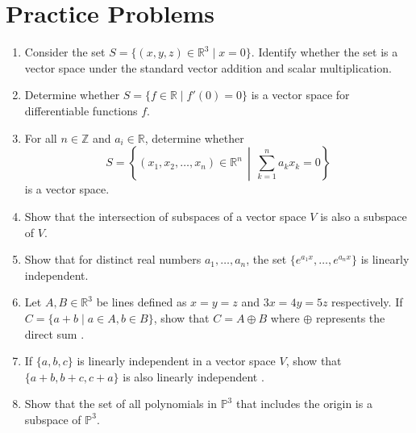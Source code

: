 \documentclass[../main.tex]{subfiles}
\begin{document}
\section{Practice Problems}
\begin{enumerate}
\item
Consider the set $S = \{ (x, y, z) \in \mathbb{R}^3 \mid x = 0 \}$.
Identify whether the set is a vector space under the standard vector
addition and scalar multiplication.

\item
Determine whether $S = \{ f \in \mathbb{R} \mid f'(0) = 0 \}$
is a vector space for differentiable functions $f$.

\item
For all $n \in \mathbb{Z}$ and $a_i \in \mathbb{R}$, determine whether
\[
S =
\left\{
    (x_1, x_2, \ldots, x_n) \in \mathbb{R}^n
    \,\middle\vert\,
    \sum_{k = 1}^n a_k x_k = 0
\right\}
\]
is a vector space.

\item
Show that the intersection of subspaces of a vector space $V$
is also a subspace of $V$.

\item
Show that for distinct real numbers $a_1, \ldots, a_n$, the set
$\{ e^{a_1 x}, \ldots, e^{a_n x} \}$ is linearly independent.

\item
Let $A, B \in \mathbb{R}^3$ be lines defined as $x = y = z$ and
$3x = 4y = 5z$ respectively. If $C = \{ a + b \mid a \in A, b \in B
\}$, show that $C = A \oplus B$ where $\oplus$ represents the direct
sum \cite{refbook1}.

\item
If $\{ a, b, c \}$ is linearly independent in a vector space $V$,
show that $\{ a+b, b+c, c+a \}$ is also linearly independent
\cite{refbook1}.

\item
Show that the set of all polynomials in $\mathbb{P}^3$ that includes
the origin is a subspace of $\mathbb{P}^3$.
\end{enumerate}
\end{document}
